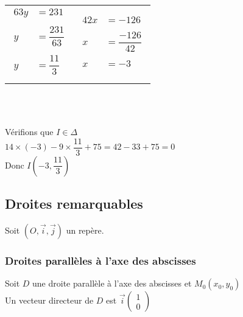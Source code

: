 {{\begin{tabular}{ll}
\begin{minipage}[b]{4cm}
\begin{equation*}
\begin{aligned}
              63y   &= 231 \\
                    &       \\
              y  &= \dfrac{231}{63} \\ 
                    &     \\
              y  &= \dfrac{11}{3} \\      
   \end{aligned} \end{equation*}
\end{minipage} & \begin{minipage}[b]{3cm} 
             \begin{equation*} \begin{aligned}
              42x &= -126\\
                  &      \\
              x  &= \dfrac{-126}{42} \\ 
                 &      \\
              x  &= -3 \\   
                  \end{aligned} \end{equation*}               
\end{minipage}\\
\end{tabular} \\  
}}\\

Vérifions que $I \in \Delta$\\

$14 \times (-3) -9 \times \dfrac{11}{3} +75 = 42 -33 +75=0$\\
Donc $I(-3, \dfrac{11}{3}) $

\newpage

         
\subsection{Droites remarquables}         

Soit $(O, \vec{i}, \vec{j})$ un repère.

\subsubsection{Droites parallèles à l'axe des abscisses}

Soit $D$ une droite parallèle à l'axe des abscisses et $M_0(x_0,y_0)$\\
Un vecteur directeur de $D$ est 
$\vec{i} \left( \begin{array}{c}
                      1\\
                      0
               \end{array} 
         \right)$
         
